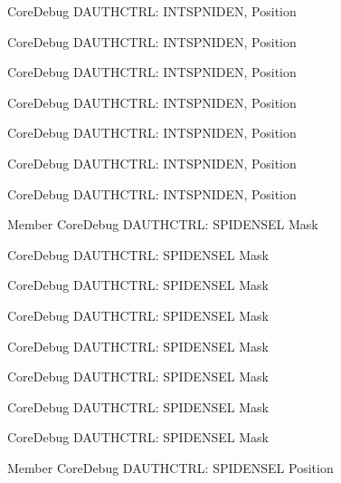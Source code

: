 \begin{DoxyRefList}
\label{deprecated__deprecated000278}%
%
Core\+Debug DAUTHCTRL\+: INTSPNIDEN, Position 

\label{deprecated__deprecated000433}%
%
Core\+Debug DAUTHCTRL\+: INTSPNIDEN, Position 

\label{deprecated__deprecated000536}%
%
Core\+Debug DAUTHCTRL\+: INTSPNIDEN, Position 

\label{deprecated__deprecated000139}%
%
Core\+Debug DAUTHCTRL\+: INTSPNIDEN, Position 

\label{deprecated__deprecated000357}%
%
Core\+Debug DAUTHCTRL\+: INTSPNIDEN, Position 

\label{deprecated__deprecated000085}%
%
Core\+Debug DAUTHCTRL\+: INTSPNIDEN, Position 

\label{deprecated__deprecated000215}%
%
Core\+Debug DAUTHCTRL\+: INTSPNIDEN, Position  
\item[Member \doxylink{group__CMSIS__SCB_gaa043fd13768d57be320c682ca1c9b234}{Core\+Debug\+\_\+\+DAUTHCTRL\+\_\+\+SPIDENSEL\+\_\+\+Msk} ]\label{deprecated__deprecated000364}%
%
Core\+Debug DAUTHCTRL\+: SPIDENSEL Mask 

\label{deprecated__deprecated000645}%
%
Core\+Debug DAUTHCTRL\+: SPIDENSEL Mask 

\label{deprecated__deprecated000222}%
%
Core\+Debug DAUTHCTRL\+: SPIDENSEL Mask 

\label{deprecated__deprecated000285}%
%
Core\+Debug DAUTHCTRL\+: SPIDENSEL Mask 

\label{deprecated__deprecated000092}%
%
Core\+Debug DAUTHCTRL\+: SPIDENSEL Mask 

\label{deprecated__deprecated000146}%
%
Core\+Debug DAUTHCTRL\+: SPIDENSEL Mask 

\label{deprecated__deprecated000440}%
%
Core\+Debug DAUTHCTRL\+: SPIDENSEL Mask 

\label{deprecated__deprecated000543}%
%
Core\+Debug DAUTHCTRL\+: SPIDENSEL Mask  
\item[Member \doxylink{group__CMSIS__SCB_ga587610b7ac18292de47bf9d675b0b88c}{Core\+Debug\+\_\+\+DAUTHCTRL\+\_\+\+SPIDENSEL\+\_\+\+Pos} ]\label{deprecated__deprecated000091}%
%
Core\+Debug DAUTHCTRL\+: SPIDENSEL Position 


\end{DoxyRefList}
